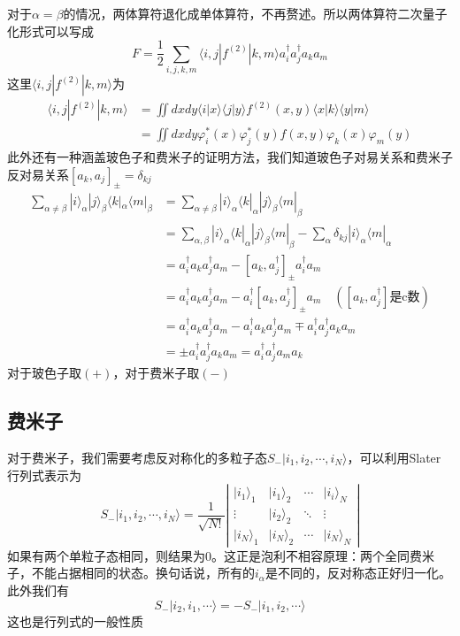 \documentclass[12pt]{article}
\begin{document}
对于$\alpha=\beta$的情况，两体算符退化成单体算符，不再赘述。所以两体算符二次量子化形式可以写成
\begin{equation*}
    F=\frac{1}{2}\sum_{i,j,k,m}\langle i,j|f^{(2)}|k,m\rangle a_i^\dagger a_j^\dagger a_k a_m
\end{equation*}
这里$\langle i,j|f^{(2)}|k,m\rangle$为
\begin{equation*}
    \begin{split}
        \langle i,j|f^{(2)}|k,m\rangle&=\iint dxdy\langle i|x\rangle\langle j|y\rangle f^{(2)}(x,y)\langle x|k\rangle\langle y|m\rangle\\
        &=\iint dxdy\varphi_i^*(x)\varphi_j^*(y)f(x,y)\varphi_k(x)\varphi_m(y)
    \end{split}
\end{equation*}
此外还有一种涵盖玻色子和费米子的证明方法，我们知道玻色子对易关系和费米子反对易关系$[a_k,a_j]_\pm=\delta_{kj}$
\begin{equation*}
    \begin{split}
        \sum_{\alpha\neq\beta}|i\rangle_\alpha|j\rangle_\beta\langle k|_\alpha\langle m|_\beta&=\sum_{\alpha\neq\beta}|i\rangle_\alpha\langle k|_\alpha|j\rangle_\beta\langle m|_\beta\\
        &=\sum_{\alpha,\beta}|i\rangle_\alpha\langle k|_\alpha|j\rangle_\beta\langle m|_\beta-\sum_{\alpha}\delta_{kj}|i\rangle_\alpha\langle m|_\alpha\\
        &=a_i^\dagger a_k a_j^\dagger a_m-[a_k,a_j^\dagger]_{\pm}a_i^\dagger a_m\\
        &=a_i^\dagger a_k a_j^\dagger a_m-a_i^\dagger[a_k,a_j^\dagger]_\pm a_m\quad(\text{$[a_k,a_j^\dagger]$是c数})\\
        &=a_i^\dagger a_k a_j^\dagger a_m-a_i^\dagger a_k a_j^\dagger a_m\mp a_i^\dagger a_j^\dagger a_k a_m\\
        &=\pm a_i^\dagger a_j^\dagger a_k a_m=a_i^\dagger a_j^\dagger a_m a_k
    \end{split}
\end{equation*}
对于玻色子取$(+)$，对于费米子取$(-)$
\subsection{费米子}
对于费米子，我们需要考虑反对称化的多粒子态$S_-|i_1,i_2,\cdots,i_N\rangle$，可以利用Slater行列式表示为
\begin{equation*}
    S_-|i_1,i_2,\cdots,i_N\rangle=\frac{1}{\sqrt{N!}}\left|\begin{matrix}
        |i_1\rangle_1&|i_1\rangle_2&\cdots&|i_i\rangle_N\\
        \vdots&|i_2\rangle_2&\ddots&\vdots\\
        |i_N\rangle_1&|i_N\rangle_2&\cdots&|i_N\rangle_N
    \end{matrix}\right|
\end{equation*}
如果有两个单粒子态相同，则结果为$0$。这正是泡利不相容原理：两个全同费米子，不能占据相同的状态。换句话说，所有的$i_\alpha$是不同的，反对称态正好归一化。此外我们有
\begin{equation*}
    S_-|i_2,i_1,\cdots\rangle=-S_-|i_1,i_2,\cdots\rangle
\end{equation*}
这也是行列式的一般性质
\end{document}
